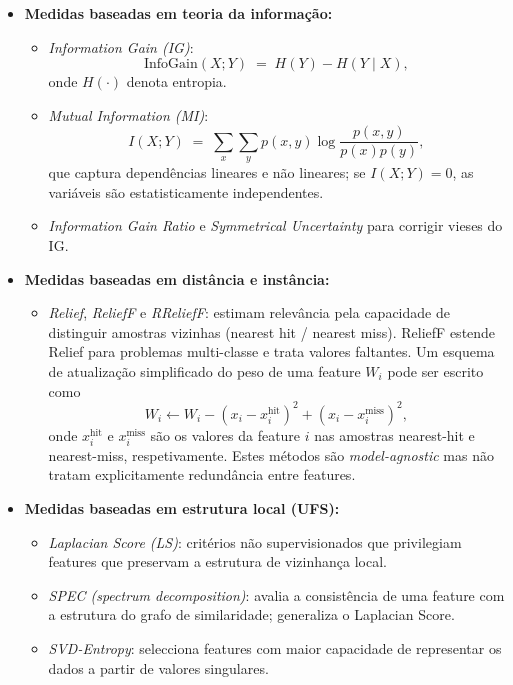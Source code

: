 \begin{itemize}
    \item \textbf{Medidas baseadas em teoria da informação:}
    \begin{itemize}
        \item \emph{Information Gain (IG)}:
        \begin{equation}
            \mathrm{InfoGain}(X;Y) \;=\; H(Y) - H(Y\mid X),
        \end{equation}
        onde \(H(\cdot)\) denota entropia. \cite{Theng2024}
        \item \emph{Mutual Information (MI)}:
        \begin{equation}
            I(X;Y) \;=\; \sum_{x}\sum_{y} p(x,y)\log\frac{p(x,y)}{p(x)p(y)},
        \end{equation}
        que captura dependências lineares e não lineares; se \(I(X;Y)=0\), as variáveis são estatisticamente independentes. \cite{Theng2024,EBRAHIMIWARKIANI2025129372,Dhal2022}
        \item \emph{Information Gain Ratio} e \emph{Symmetrical Uncertainty} para corrigir vieses do IG. \cite{Theng2024,Dhal2022}
    \end{itemize}

    \item \textbf{Medidas baseadas em distância e instância:}
    \begin{itemize}
        \item \emph{Relief}, \emph{ReliefF} e \emph{RReliefF}: estimam relevância pela capacidade de distinguir amostras vizinhas (nearest hit / nearest miss). ReliefF estende Relief para problemas multi-classe e trata valores faltantes. Um esquema de atualização simplificado do peso de uma feature \(W_i\) pode ser escrito como
        \begin{equation}
            W_i \leftarrow W_i - (x_i - x_i^{\text{hit}})^2 + (x_i - x_i^{\text{miss}})^2,
        \end{equation}
        onde \(x_i^{\text{hit}}\) e \(x_i^{\text{miss}}\) são os valores da feature \(i\) nas amostras nearest-hit e nearest-miss, respetivamente. Estes métodos são \emph{model-agnostic} mas não tratam explicitamente redundância entre features. \cite{Theng2024,EBRAHIMIWARKIANI2025129372,Dhal2022}
    \end{itemize}

    \item \textbf{Medidas baseadas em estrutura local (UFS):}
    \begin{itemize}
        \item \emph{Laplacian Score (LS)}: critérios não supervisionados que privilegiam features que preservam a estrutura de vizinhança local. \cite{Theng2024,EBRAHIMIWARKIANI2025129372,SolorioFernandez2020}
        \item \emph{SPEC (spectrum decomposition)}: avalia a consistência de uma feature com a estrutura do grafo de similaridade; generaliza o Laplacian Score. \cite{SolorioFernandez2020}
        \item \emph{SVD-Entropy}: selecciona features com maior capacidade de representar os dados a partir de valores singulares. \cite{SolorioFernandez2020}
    \end{itemize}
\end{itemize}

